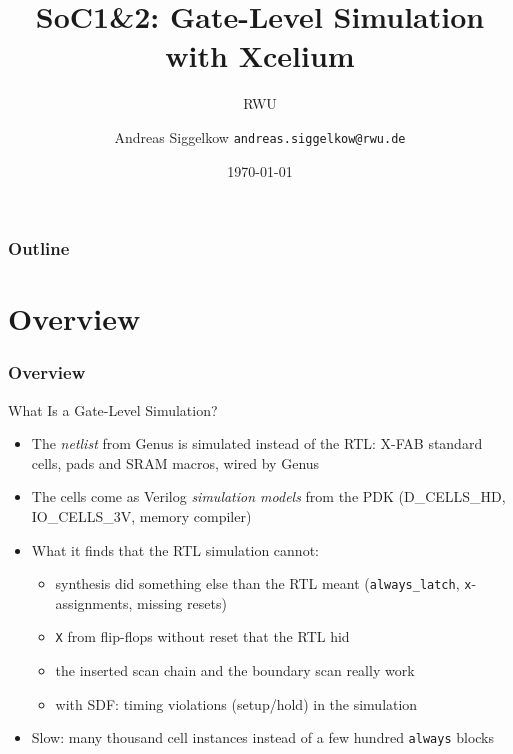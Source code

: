 \documentclass{beamer}
\title{SoC1\&2: Gate-Level Simulation with Xcelium}
\author[AS]{Andreas Siggelkow \newline \texttt{andreas.siggelkow@rwu.de}}
\date[2026]{\today}
\subtitle{RWU}
\institute{Elektrotechnik und Informatik}
\newcommand{\astitle}{nix}
\newcommand{\assubtitle}{nix}
\newcommand{\cmd}[1]{\texttt{#1}}
\begin{document}
\setcounter{tocdepth}{1}

\begin{frame}
  \titlepage
\end{frame}

\begin{frame}
  \frametitle{Outline}
  \tableofcontents
\end{frame}

\section{Overview}
\renewcommand{\astitle}{Overview}

\renewcommand{\assubtitle}{What Is a Gate-Level Simulation?}
\begin{frame}
\frametitle{\astitle}
\begin{block}{\assubtitle}
  \begin{itemize}
    \item The \emph{netlist} from Genus is simulated instead of the RTL:
      X-FAB standard cells, pads and SRAM macros, wired by Genus
    \item The cells come as Verilog \emph{simulation models} from the PDK
      (D\_CELLS\_HD, IO\_CELLS\_3V, memory compiler)
    \item What it finds that the RTL simulation cannot:
    \begin{itemize}
      \item synthesis did something else than the RTL meant
        (\cmd{always\_latch}, \cmd{x}-assignments, missing resets)
      \item \cmd{X} from flip-flops without reset that the RTL hid
      \item the inserted scan chain and the boundary scan really work
      \item with SDF: timing violations (setup/hold) in the simulation
    \end{itemize}
    \item Slow: many thousand cell instances instead of a few hundred
      \cmd{always} blocks
  \end{itemize}
\end{block}
\end{frame}
\end{document}
